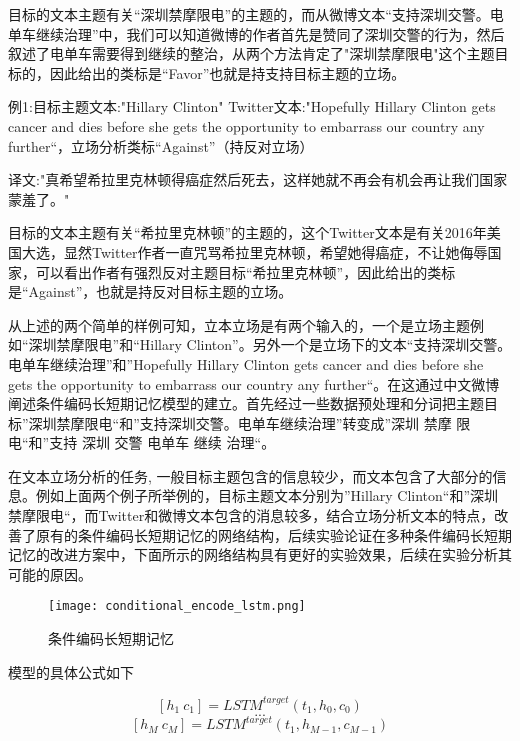 目标的文本主题有关“深圳禁摩限电”的主题的，而从微博文本“支持深圳交警。电单车继续治理”中，我们可以知道微博的作者首先是赞同了深圳交警的行为，然后叙述了电单车需要得到继续的整治，从两个方法肯定了"深圳禁摩限电"这个主题目标的，因此给出的类标是“Favor”也就是持支持目标主题的立场。

例1:目标主题文本:"Hillary Clinton" Twitter文本:"Hopefully Hillary Clinton gets cancer and dies before she gets the opportunity to embarrass our country any further“，立场分析类标“Against”（持反对立场）

译文:"真希望希拉里克林顿得癌症然后死去，这样她就不再会有机会再让我们国家蒙羞了。"

目标的文本主题有关“希拉里克林顿”的主题的，这个Twitter文本是有关2016年美国大选，显然Twitter作者一直咒骂希拉里克林顿，希望她得癌症，不让她侮辱国家，可以看出作者有强烈反对主题目标“希拉里克林顿”，因此给出的类标是“Against”，也就是持反对目标主题的立场。

从上述的两个简单的样例可知，立本立场是有两个输入的，一个是立场主题例如“深圳禁摩限电”和“Hillary Clinton”。另外一个是立场下的文本“支持深圳交警。电单车继续治理”和”Hopefully Hillary Clinton gets cancer and dies before she gets the opportunity to embarrass our country any further“。在这通过中文微博阐述条件编码长短期记忆模型的建立。首先经过一些数据预处理和分词把主题目标”深圳禁摩限电“和”支持深圳交警。电单车继续治理”转变成”深圳 禁摩 限电“和”支持 深圳 交警 电单车 继续 治理“。

在文本立场分析的任务, 一般目标主题包含的信息较少，而文本包含了大部分的信息。例如上面两个例子所举例的，目标主题文本分别为”Hillary Clinton“和”深圳禁摩限电“，而Twitter和微博文本包含的消息较多，结合立场分析文本的特点，改善了原有的条件编码长短期记忆的网络结构，后续实验论证在多种条件编码长短期记忆的改进方案中，下面所示的网络结构具有更好的实验效果，后续在实验分析其可能的原因。

\begin{figure}[htbp]
	\centering
	\texttt{[image: conditional\_encode\_lstm.png]}
	\caption[rnn_vanish]{条件编码长短期记忆}
\end{figure}

模型的具体公式如下

\begin{equation}\label{lstm_f}[h_1~c_1] = LSTM^{target}(t_1,h_0,c_0)\end{equation}
$$...$$
\begin{equation}\label{lstm_f}[h_M~c_M] = LSTM^{target}(t_1,h_{M-1},c_{M-1})\end{equation}

